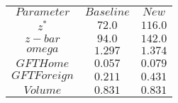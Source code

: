 \begin{tabular}{ccc}
$Parameter$ & $Baseline$ & $New$\\
$z^*$ & $72.0$ & $116.0$\\
$z-bar$ & $94.0$ & $142.0$\\
$omega$ & $1.297$ & $1.374$\\
$GFT Home$ & $0.057$ & $0.079$\\
$GFT Foreign$ & $0.211$ & $0.431$\\
$Volume$ & $0.831$ & $0.831$\\
\end{tabular}

